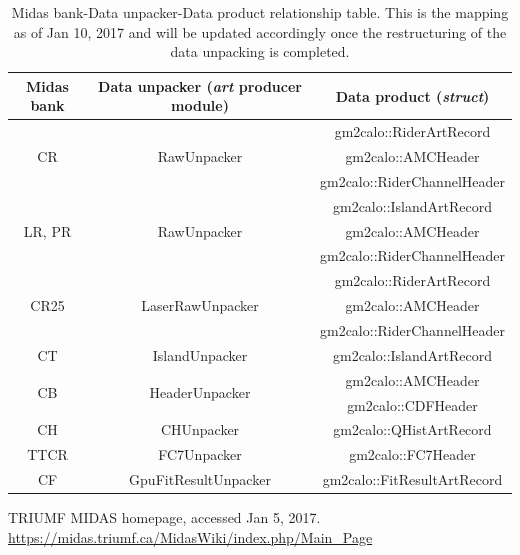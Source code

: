 \begin{table}[htbp]
\centering
\caption{Midas bank-Data unpacker-Data product relationship table. This is the mapping as of Jan 10, 2017 and will be updated accordingly once the restructuring of the data unpacking is completed.}
\begin{tabular}{|c|c|c|}
\hline
Midas bank & Data unpacker (\textit{art} producer module) & Data product (\textit{struct}) \\
\hline
\multirow{3}{*}{CR} & \multirow{3}{*}{RawUnpacker} & gm2calo::RiderArtRecord \\
& & gm2calo::AMCHeader \\
& & gm2calo::RiderChannelHeader \\
\hline
\multirow{3}{*}{LR, PR} & \multirow{3}{*}{RawUnpacker} & gm2calo::IslandArtRecord \\
& & gm2calo::AMCHeader \\
& & gm2calo::RiderChannelHeader \\
\hline
\multirow{3}{*}{CR25} & \multirow{3}{*}{LaserRawUnpacker} & gm2calo::RiderArtRecord \\
& & gm2calo::AMCHeader \\
& & gm2calo::RiderChannelHeader \\
\hline
CT & IslandUnpacker & gm2calo::IslandArtRecord \\
\hline
\multirow{2}{*}{CB} & \multirow{2}{*}{HeaderUnpacker} & gm2calo::AMCHeader \\
\cline{3-3}
& & gm2calo::CDFHeader \\
\hline
CH & CHUnpacker & gm2calo::QHistArtRecord \\
\hline
TTCR & FC7Unpacker & gm2calo::FC7Header \\
\hline
CF & GpuFitResultUnpacker & gm2calo::FitResultArtRecord \\
\hline
\end{tabular} 
\label{tab:cheatsheet}
\end{table}


\begin{thebibliography}{9}
TRIUMF MIDAS homepage, accessed Jan 5, 2017. 
\url{https://midas.triumf.ca/MidasWiki/index.php/Main_Page}

\end{thebibliography}



